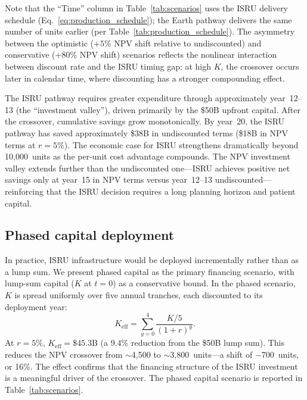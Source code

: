 \documentclass[preprint,12pt]{elsarticle}
\begin{document}
Note that the ``Time'' column in Table~\ref{tab:scenarios} uses the ISRU delivery schedule (Eq.~\ref{eq:production_schedule}); the Earth pathway delivers the same number of units earlier (per Table~\ref{tab:production_schedule}). The asymmetry between the optimistic ($+5\%$ NPV shift relative to undiscounted) and conservative ($+80\%$ NPV shift) scenarios reflects the nonlinear interaction between discount rate and the ISRU timing gap: at high $K$, the crossover occurs later in calendar time, where discounting has a stronger compounding effect.

The ISRU pathway requires greater expenditure through approximately year~12--13 (the ``investment valley''), driven primarily by the \$50B upfront capital. After the crossover, cumulative savings grow monotonically. By year~20, the ISRU pathway has saved approximately \$38B in undiscounted terms (\$18B in NPV terms at $r = 5\%$). The economic case for ISRU strengthens dramatically beyond 10{,}000~units as the per-unit cost advantage compounds. The NPV investment valley extends further than the undiscounted one---ISRU achieves positive net savings only at year~15 in NPV terms versus year~12--13 undiscounted---reinforcing that the ISRU decision requires a long planning horizon and patient capital.

\subsection{Phased capital deployment}
\label{sec:phased_capital}

In practice, ISRU infrastructure would be deployed incrementally rather than as a lump sum. We present phased capital as the primary financing scenario, with lump-sum capital ($K$ at $t = 0$) as a conservative bound. In the phased scenario, $K$ is spread uniformly over five annual tranches, each discounted to its deployment year:
\begin{equation}
  K_{\mathrm{eff}} = \sum_{y=0}^{4} \frac{K/5}{(1+r)^y}.
  \label{eq:phased_capital}
\end{equation}
At $r = 5\%$, $K_{\mathrm{eff}} = \$45.3$B (a 9.4\% reduction from the \$50B lump sum). This reduces the NPV crossover from $\sim$4{,}500 to $\sim$3{,}800~units---a shift of $-$700~units, or 16\%. The effect confirms that the financing structure of the ISRU investment is a meaningful driver of the crossover. The phased capital scenario is reported in Table~\ref{tab:scenarios}.
\end{document}
